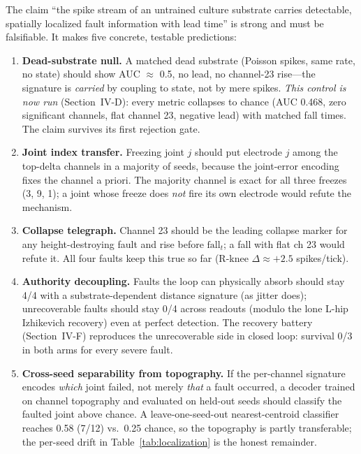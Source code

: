The claim ``the spike stream of an untrained culture substrate carries
detectable, spatially localized fault information with lead time'' is strong
and must be falsifiable. It makes five concrete, testable predictions:
\begin{enumerate}
\item \textbf{Dead-substrate null.} A matched dead substrate (Poisson spikes,
      same rate, no state) should show AUC $\approx$ 0.5, no lead, no
      channel-23 rise---the signature is \emph{carried} by coupling to state,
      not by mere spikes. \emph{This control is now run} (Section~IV-D): every
      metric collapses to chance (AUC 0.468, zero significant channels, flat
      channel 23, negative lead) with matched fall times. The claim survives
      its first rejection gate.
\item \textbf{Joint index transfer.} Freezing joint $j$ should put electrode
      $j$ among the top-delta channels in a majority of seeds, because the
      joint-error encoding fixes the channel a priori. The majority channel is
      exact for all three freezes (3, 9, 1); a joint whose freeze does
      \emph{not} fire its own electrode would refute the mechanism.
\item \textbf{Collapse telegraph.} Channel 23 should be the leading collapse
      marker for any height-destroying fault and rise before $\mathrm{fall}_t$;
      a fall with flat ch 23 would refute it. All four faults keep this true
      so far (R-knee $\Delta \approx +2.5$ spikes/tick).
\item \textbf{Authority decoupling.} Faults the loop can physically absorb
      should stay 4/4 with a substrate-dependent distance signature (as jitter
      does); unrecoverable faults should stay 0/4 across readouts (modulo the
      lone L-hip Izhikevich recovery) even at perfect detection. The recovery
      battery (Section~IV-F) reproduces the unrecoverable side in closed loop:
      survival 0/3 in both arms for every severe fault.
\item \textbf{Cross-seed separability from topography.} If the per-channel
      signature encodes \emph{which} joint failed, not merely \emph{that} a
      fault occurred, a decoder trained on channel topography and evaluated on
      held-out seeds should classify the faulted joint above chance. A
      leave-one-seed-out nearest-centroid classifier reaches 0.58 (7/12) vs.\
      0.25 chance, so the topography is partly transferable; the per-seed drift
      in Table~\ref{tab:localization} is the honest remainder.
\end{enumerate}

